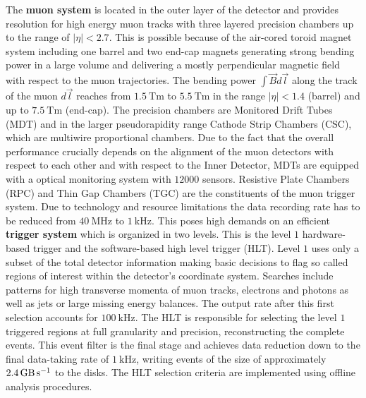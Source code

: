 The \textbf{muon system} is located in the outer layer of the {\ATLAS} detector and provides resolution for high energy muon tracks with three layered precision chambers up to the range of $|\eta|<2.7$. This is possible because of the air-cored toroid magnet system including one barrel and two end-cap magnets generating strong bending power in a large volume and delivering  a mostly perpendicular magnetic field with respect to the muon trajectories. The bending power $\int{\vec{B}d\vec{l}}$ along the track of the muon $d\vec{l}$ reaches from $\SI{1.5}{\tesla\meter}$ to $\SI{5.5}{\tesla\meter}$ in the range $|\eta|<1.4$ (barrel) and up to $\SI{7.5}{\tesla\meter}$ (end-cap). The precision chambers are Monitored Drift Tubes (MDT) and in the larger pseudorapidity range Cathode Strip Chambers (CSC), which are multiwire proportional chambers. Due to the fact that the overall performance crucially depends on the alignment of the muon detectors with respect to each other and with respect to the Inner Detector, MDTs are equipped with a optical monitoring system with $12000$ sensors. Resistive Plate Chambers (RPC) and Thin Gap Chambers (TGC) are the constituents of the muon trigger system. \cite{ATLASJINST} \newline %
Due to technology and resource limitations the data recording rate has to be reduced from $\SI{40}{\mega\hertz}$ to $\SI{1}{\kilo\hertz}$. This poses high demands on an efficient \textbf{trigger system} which is organized in two levels. This is the level $1$ hardware-based trigger and the software-based high level trigger (HLT). Level $1$ uses only a subset of the total detector information making basic decisions to flag so called regions of interest within the detector's coordinate system. Searches include patterns for high transverse momenta of muon tracks, electrons and photons as well as jets or large missing energy balances. The output rate after this first selection accounts for $\SI{100}{\kilo\hertz}$. The HLT is responsible for selecting the level $1$ triggered regions at full granularity and precision, reconstructing the complete events. This event filter is the final stage and achieves data reduction down to the final data-taking rate of $\SI{1}{\kilo\hertz}$, writing events of the size of approximately $\SI{2.4}{\giga\byte\per\second}$ to the disks. The HLT selection criteria are implemented using offline analysis procedures. \cite{ATLASJINST}\cite{newATLASJINST} %

